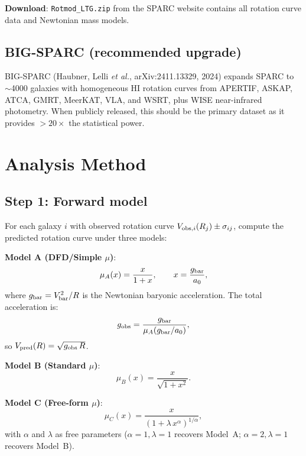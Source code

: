 \documentclass[11pt]{article}
\begin{document}
\textbf{Download}: \texttt{Rotmod\_LTG.zip} from the SPARC website
contains all rotation curve data and Newtonian mass models.

\subsection{BIG-SPARC (recommended upgrade)}

BIG-SPARC (Haubner, Lelli \textit{et al.}, arXiv:2411.13329, 2024)
expands SPARC to $\sim$4000 galaxies with homogeneous HI rotation
curves from APERTIF, ASKAP, ATCA, GMRT, MeerKAT, VLA, and WSRT,
plus WISE near-infrared photometry. When publicly released, this
should be the primary dataset as it provides $>20\times$ the
statistical power.

\section{Analysis Method}

\subsection{Step 1: Forward model}

For each galaxy $i$ with observed rotation curve
$V_{{\rm obs},i}(R_j) \pm \sigma_{ij}$, compute the predicted
rotation curve under three models:

\textbf{Model A (DFD/Simple $\mu$)}:
\begin{equation}
\mu_A(x) = \frac{x}{1+x}, \qquad x = \frac{g_{\rm bar}}{a_0},
\end{equation}
where $g_{\rm bar} = V_{\rm bar}^2/R$ is the Newtonian baryonic
acceleration. The total acceleration is:
\begin{equation}
g_{\rm obs} = \frac{g_{\rm bar}}{\mu_A(g_{\rm bar}/a_0)},
\end{equation}
so $V_{\rm pred}(R) = \sqrt{g_{\rm obs}\,R}$.

\textbf{Model B (Standard $\mu$)}:
\begin{equation}
\mu_B(x) = \frac{x}{\sqrt{1+x^2}}.
\end{equation}

\textbf{Model C (Free-form $\mu$)}:
\begin{equation}
\mu_C(x) = \frac{x}{(1 + \lambda\,x^\alpha)^{1/\alpha}},
\end{equation}
with $\alpha$ and $\lambda$ as free parameters ($\alpha = 1,
\lambda = 1$ recovers Model~A; $\alpha = 2, \lambda = 1$ recovers
Model~B).
\end{document}
